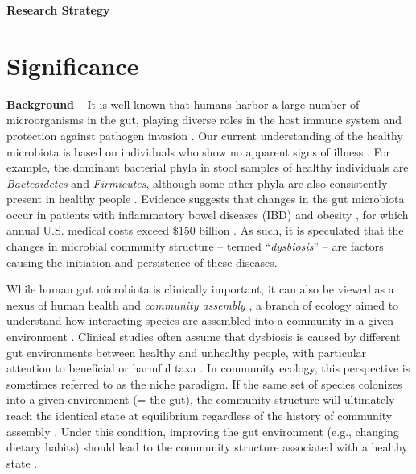 \documentclass[12pt, class=article, crop=false]{standalone}
\begin{document}
\textbf{Research Strategy}

\section{Significance}

\textbf{Background} --
It is well known that humans harbor a large number of microorganisms in the gut, playing diverse roles in the host immune system and protection against pathogen invasion \citep{fierer_animalcules_2012, petersen_defining_2014, turroni_infant_2020}.
Our current understanding of the healthy microbiota is based on individuals who show no apparent signs of illness \citep{petersen_defining_2014}.
For example, the dominant bacterial phyla in stool samples of healthy individuals are \textit{Bacteoidetes} and \textit{Firmicutes}, although some other phyla are also consistently present in healthy people \citep{petersen_defining_2014}.
Evidence suggests that changes in the gut microbiota occur in patients with inflammatory bowel diseases (IBD) \citep{frank_molecular-phylogenetic_2007, karlsson_gut_2013, abrahamsson_low_2014, parracho_differences_2005} and obesity \citep{costello_application_2012, ley_obesity_2005, turnbaugh_diet-induced_2008}, for which annual U.S. medical costs exceed \$150 billion \citep{singh_trends_2022, cawley_medical_2012}.
As such, it is speculated that the changes in microbial community structure -- termed ``\textit{dysbiosis}'' -- are factors causing the initiation and persistence of these diseases.

While human gut microbiota is clinically important, it can also be viewed as a nexus of human health and \textit{community assembly} \citep{costello_application_2012}, a branch of ecology aimed to understand how interacting species are assembled into a community in a given environment \citep{fukami_historical_2015, sprockett_role_2018}.
Clinical studies often assume that dysbiosis is caused by different gut environments between healthy and unhealthy people, with particular attention to beneficial or harmful taxa \citep{petersen_defining_2014}.
In community ecology, this perspective is sometimes referred to as the niche paradigm.
If the same set of species colonizes into a given environment (= the gut), the community structure will ultimately reach the identical state at equilibrium regardless of the history of community assembly \citep{chase_community_2003}.
Under this condition, improving the gut environment (e.g., changing dietary habits) should lead to the community structure associated with a healthy state \citep{chase_community_2003, leibold_metacommunity_2004, fukami_historical_2015, hooper_how_2002, reese_thinking_2019}.
\end{document}
